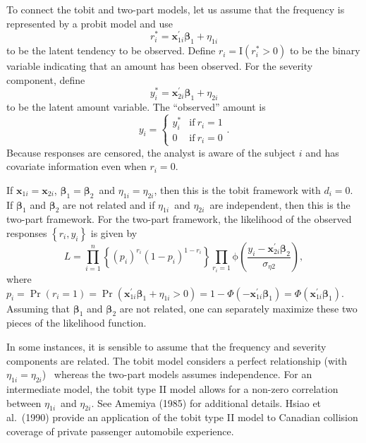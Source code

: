 To connect the tobit and two-part models, let us assume that the
frequency is represented by a probit model and use
\begin{equation*}
r_i^{\ast}=\mathbf{x}_{1i}^{\prime}\boldsymbol \beta_{1}+\eta_{1i}
\end{equation*}
to be the latent tendency to be observed. Define
$r_i=\mathrm{I}\left( r_i^{\ast}>0\right) $ to be the binary
variable indicating that an amount has been observed. For the
severity component, define
\begin{equation*}
y_i^{\ast}=\mathbf{x}_{2i}^{\prime}\boldsymbol \beta_{1}+\eta_{2i}
\end{equation*}
to be the latent amount variable. The ``observed'' amount is
\begin{equation*}
y_i=\left\{
\begin{array}{ll}
y_i^{\ast} & \mathrm{if~}r_i=1 \\
0 & \mathrm{if~}r_i=0%
\end{array}
\right. .
\end{equation*}
Because responses are censored, the analyst is aware of the subject
$i$ and has covariate information even when $r_i = 0$.

If $\mathbf{x}_{1i}=\mathbf{x}_{2i}$, $\boldsymbol
\beta_{1}=\boldsymbol \beta _{2}$\ and $\eta_{1i}=\eta_{2i}$, then
this is the tobit framework with $d_i=0$. If $ \boldsymbol
\beta_{1}$ and $\boldsymbol \beta_{2}$ are not related and if
$\eta_{1i}$\ and $\eta_{2i}$\ are independent, then this is the
two-part framework. For the two-part framework, the likelihood of
the observed responses $\left\{ r_i,y_i\right\} $ is given by
\begin{equation}\label{E16:TwopartLikelihood}
L=\prod\limits_{i=1}^{n}\left\{ \left( p_i\right) ^{r_i}\left(
1-p_i\right) ^{1-r_i}\right\} \prod\limits_{r_i=1}\mathrm{\phi }
\left( \frac{y_i-\mathbf{x}_{2i}^{\prime} \boldsymbol \beta_{2}}{
\sigma_{\eta 2}}\right) ,
\end{equation}
where $p_i=\Pr \left( r_i=1\right) =\Pr \left(
\mathbf{x}_{1i}^{\mathbf{ \prime }}\boldsymbol
\beta_{1}+\eta_{1i}>0\right) =1-\Phi \left( -\mathbf{x}
_{1i}^{\prime}\boldsymbol \beta_{1}\right) =\Phi \left( \mathbf{x}
_{1i}^{\prime}\boldsymbol \beta_{1}\right) .$ Assuming that
$\boldsymbol \beta_1$ and $\boldsymbol \beta_2$ are not related, one
can separately maximize these two pieces of the likelihood function.

In some instances, it is sensible to assume that the frequency and
severity components are related. The tobit model considers a perfect
relationship (with $\eta_{1i}=\eta_{2i}$) \ whereas the two-part
models assumes independence. For an intermediate model, the tobit
type II model allows for a non-zero correlation between $\eta
_{1i}$\ and $\eta_{2i}$. See Amemiya (1985) for additional details.
Hsiao et al.\ (1990) provide an application of the tobit type II
model to Canadian collision coverage of private passenger automobile
experience.

